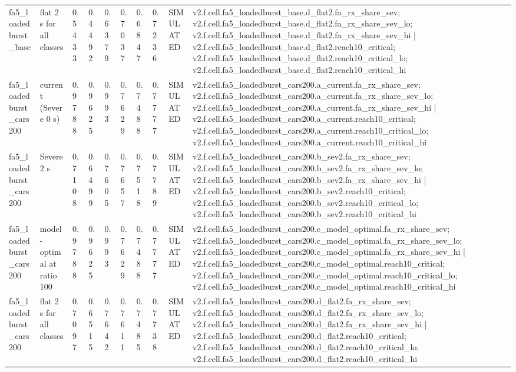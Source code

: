 \begin{table}[t]
\begin{tabular}{llllllllll}
fa5\_loadedburst\_base & flat 2 s for all classes & 0.5433 & 0.4492 & 0.6379 & 0.7037 & 0.6847 & 0.7236 & SIMULATED & v2.f.cell.fa5\_loadedburst\_base.d\_flat2.fa\_rx\_share\_sev; v2.f.cell.fa5\_loadedburst\_base.d\_flat2.fa\_rx\_share\_sev\_lo; v2.f.cell.fa5\_loadedburst\_base.d\_flat2.fa\_rx\_share\_sev\_hi | v2.f.cell.fa5\_loadedburst\_base.d\_flat2.reach10\_critical; v2.f.cell.fa5\_loadedburst\_base.d\_flat2.reach10\_critical\_lo; v2.f.cell.fa5\_loadedburst\_base.d\_flat2.reach10\_critical\_hi \\
fa5\_loadedburst\_cars200 & current (Severe 0 s) & 0.9788 & 0.9625 & 0.993 & 0.7629 & 0.7488 & 0.7777 & SIMULATED & v2.f.cell.fa5\_loadedburst\_cars200.a\_current.fa\_rx\_share\_sev; v2.f.cell.fa5\_loadedburst\_cars200.a\_current.fa\_rx\_share\_sev\_lo; v2.f.cell.fa5\_loadedburst\_cars200.a\_current.fa\_rx\_share\_sev\_hi | v2.f.cell.fa5\_loadedburst\_cars200.a\_current.reach10\_critical; v2.f.cell.fa5\_loadedburst\_cars200.a\_current.reach10\_critical\_lo; v2.f.cell.fa5\_loadedburst\_cars200.a\_current.reach10\_critical\_hi \\
fa5\_loadedburst\_cars200 & Severe 2 s & 0.7108 & 0.6499 & 0.7605 & 0.7657 & 0.7518 & 0.7789 & SIMULATED & v2.f.cell.fa5\_loadedburst\_cars200.b\_sev2.fa\_rx\_share\_sev; v2.f.cell.fa5\_loadedburst\_cars200.b\_sev2.fa\_rx\_share\_sev\_lo; v2.f.cell.fa5\_loadedburst\_cars200.b\_sev2.fa\_rx\_share\_sev\_hi | v2.f.cell.fa5\_loadedburst\_cars200.b\_sev2.reach10\_critical; v2.f.cell.fa5\_loadedburst\_cars200.b\_sev2.reach10\_critical\_lo; v2.f.cell.fa5\_loadedburst\_cars200.b\_sev2.reach10\_critical\_hi \\
fa5\_loadedburst\_cars200 & model-optimal at ratio 100 & 0.9788 & 0.9625 & 0.993 & 0.7629 & 0.7488 & 0.7777 & SIMULATED & v2.f.cell.fa5\_loadedburst\_cars200.c\_model\_optimal.fa\_rx\_share\_sev; v2.f.cell.fa5\_loadedburst\_cars200.c\_model\_optimal.fa\_rx\_share\_sev\_lo; v2.f.cell.fa5\_loadedburst\_cars200.c\_model\_optimal.fa\_rx\_share\_sev\_hi | v2.f.cell.fa5\_loadedburst\_cars200.c\_model\_optimal.reach10\_critical; v2.f.cell.fa5\_loadedburst\_cars200.c\_model\_optimal.reach10\_critical\_lo; v2.f.cell.fa5\_loadedburst\_cars200.c\_model\_optimal.reach10\_critical\_hi \\
fa5\_loadedburst\_cars200 & flat 2 s for all classes & 0.7097 & 0.6515 & 0.7642 & 0.7611 & 0.7485 & 0.7738 & SIMULATED & v2.f.cell.fa5\_loadedburst\_cars200.d\_flat2.fa\_rx\_share\_sev; v2.f.cell.fa5\_loadedburst\_cars200.d\_flat2.fa\_rx\_share\_sev\_lo; v2.f.cell.fa5\_loadedburst\_cars200.d\_flat2.fa\_rx\_share\_sev\_hi | v2.f.cell.fa5\_loadedburst\_cars200.d\_flat2.reach10\_critical; v2.f.cell.fa5\_loadedburst\_cars200.d\_flat2.reach10\_critical\_lo; v2.f.cell.fa5\_loadedburst\_cars200.d\_flat2.reach10\_critical\_hi \\

\end{tabular}
\end{table}
